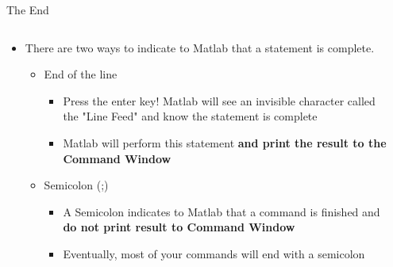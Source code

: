 {}\documentclass[letterpaper,
compress,
xcolor=x11names,
]{beamer}
\begin{document}
\begin{frame}{The End }
	\footnotesize
	\begin{columns}
		\begin{column}{0.65\linewidth}
			\begin{itemize}
				\item<2-> There are two ways to indicate to Matlab that a statement is complete.
				\begin{itemize}
					\item<3-> End of the line
					\begin{itemize}
						\item Press the enter key! Matlab will see an invisible character called the "Line Feed" and know the statement is complete
						\item Matlab will perform this statement \textbf{and print the result to the Command Window}
					\end{itemize}
					\item<4-> Semicolon (;)
					\begin{itemize}
						\item A Semicolon indicates to Matlab that a command is finished and \textbf{do not print result to Command Window} 
						\item Eventually, most of your commands will end with a semicolon
					\end{itemize}
				\end{itemize}
			\end{itemize}
		\end{column}
		\begin{column}{0.3\linewidth}
			\begin{center}
			\end{center}
		\end{column}
	\end{columns}
\end{frame}
\end{document}
